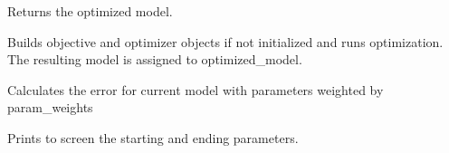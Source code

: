 \documentclass[letterpaper,10pt,english]{sphinxmanual}
\begin{document}
\begin{fulllineitems}

\begin{fulllineitems}
\label{classes:catkernel.CATKernel.get_optimized_model}
Returns the optimized model.

\end{fulllineitems}


\begin{fulllineitems}
\label{classes:catkernel.CATKernel.optimize}
Builds objective and optimizer objects if not initialized and 
runs optimization. The resulting model is assigned to optimized\_model.

\end{fulllineitems}


\begin{fulllineitems}
\label{classes:catkernel.CATKernel.test}
Calculates the error for current model with parameters weighted by
param\_weights

\end{fulllineitems}


\begin{fulllineitems}
\label{classes:catkernel.CATKernel.write_summary}
Prints to screen the starting and ending parameters.

\end{fulllineitems}


\end{fulllineitems}

\end{document}
